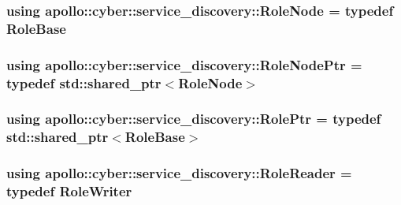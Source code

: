 \hypertarget{namespaceapollo_1_1cyber_1_1service__discovery_a215a77a4c98a99914680e6234f6a3806}{
\subsubsection[{Role\-Node}]{\setlength{\rightskip}{0pt plus 5cm}using {\bf apollo\-::cyber\-::service\-\_\-discovery\-::\-Role\-Node} = typedef {\bf Role\-Base}}}\label{namespaceapollo_1_1cyber_1_1service__discovery_a215a77a4c98a99914680e6234f6a3806}
\hypertarget{namespaceapollo_1_1cyber_1_1service__discovery_ab1151fabf4ca79506ed917781c500b5e}{
\subsubsection[{Role\-Node\-Ptr}]{\setlength{\rightskip}{0pt plus 5cm}using {\bf apollo\-::cyber\-::service\-\_\-discovery\-::\-Role\-Node\-Ptr} = typedef std\-::shared\-\_\-ptr$<${\bf Role\-Node}$>$}}\label{namespaceapollo_1_1cyber_1_1service__discovery_ab1151fabf4ca79506ed917781c500b5e}
\hypertarget{namespaceapollo_1_1cyber_1_1service__discovery_a47c65bbb4b41d9ae41bfbd33271df525}{
\subsubsection[{Role\-Ptr}]{\setlength{\rightskip}{0pt plus 5cm}using {\bf apollo\-::cyber\-::service\-\_\-discovery\-::\-Role\-Ptr} = typedef std\-::shared\-\_\-ptr$<${\bf Role\-Base}$>$}}\label{namespaceapollo_1_1cyber_1_1service__discovery_a47c65bbb4b41d9ae41bfbd33271df525}
\hypertarget{namespaceapollo_1_1cyber_1_1service__discovery_a5d6b4379a39ee25ab414b1b2a8998e28}{
\subsubsection[{Role\-Reader}]{\setlength{\rightskip}{0pt plus 5cm}using {\bf apollo\-::cyber\-::service\-\_\-discovery\-::\-Role\-Reader} = typedef {\bf Role\-Writer}}}\label{namespaceapollo_1_1cyber_1_1service__discovery_a5d6b4379a39ee25ab414b1b2a8998e28}
